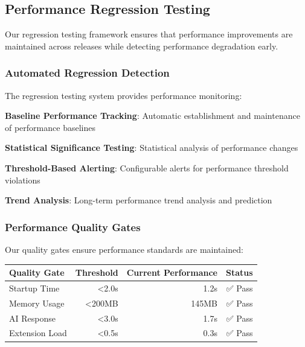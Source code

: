 \subsection*{Performance Regression Testing}

Our regression testing framework ensures that performance improvements are maintained across releases while detecting performance degradation early.

\subsubsection*{Automated Regression Detection}

The regression testing system provides performance monitoring:

\begin{compactlist}
    \item \textbf{Baseline Performance Tracking}: Automatic establishment and maintenance of performance baselines
    \item \textbf{Statistical Significance Testing}: Statistical analysis of performance changes
    \item \textbf{Threshold-Based Alerting}: Configurable alerts for performance threshold violations
    \item \textbf{Trend Analysis}: Long-term performance trend analysis and prediction
\end{compactlist}

\subsubsection*{Performance Quality Gates}

Our quality gates ensure performance standards are maintained:

\begin{center}
\begin{tabular}{@{}lrrr@{}}
\toprule
\textbf{Quality Gate} & \textbf{Threshold} & \textbf{Current Performance} & \textbf{Status} \\
\midrule
Startup Time & <2.0s & 1.2s & ✅ Pass \\
Memory Usage & <200MB & 145MB & ✅ Pass \\
AI Response & <3.0s & 1.7s & ✅ Pass \\
Extension Load & <0.5s & 0.3s & ✅ Pass \\
\bottomrule
\end{tabular}
\end{center}

